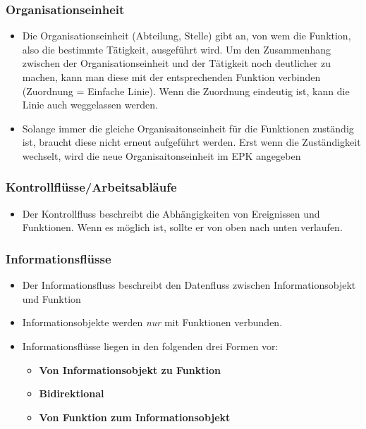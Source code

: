 \documentclass[a4paper, 12pt]{report}
\begin{document}
\begin{multicols}{2}
\subsubsection{Organisationseinheit}


\begin{itemize}
	\item Die Organisationseinheit (Abteilung, Stelle) gibt an, von wem die 
		Funktion, also die bestimmte Tätigkeit, ausgeführt wird. Um den 
		Zusammenhang zwischen der Organisationseinheit und der Tätigkeit 
		noch deutlicher zu machen, kann man diese mit der entsprechenden 
		Funktion verbinden (Zuordnung = Einfache Linie). Wenn die 
		Zuordnung eindeutig ist, kann die Linie auch weggelassen werden.
	\item Solange immer die gleiche Organisaitonseinheit für die Funktionen 
		zuständig ist, braucht diese nicht erneut aufgeführt werden. Erst wenn
		die Zuständigkeit wechselt, wird die neue Organisaitonseinheit im EPK 
		angegeben
\end{itemize}

\subsubsection{Kontrollflüsse/Arbeitsabläufe}

\begin{itemize}
	\item Der Kontrollfluss beschreibt die Abhängigkeiten von Ereignissen und 
		Funktionen. Wenn es möglich ist, sollte er von oben nach unten 
		verlaufen. 
\end{itemize}

\subsubsection{Informationsflüsse}

\begin{itemize}
	\item Der Informationsfluss beschreibt den Datenfluss zwischen 
		Informationsobjekt und Funktion
	\item Informationsobjekte werden \emph{nur} mit Funktionen verbunden. 
	\item Informationsflüsse liegen in den folgenden drei Formen vor:
	\begin{itemize}
		\item \textbf{Von Informationsobjekt zu Funktion}
		\item \textbf{Bidirektional}
		\item \textbf{Von Funktion zum Informationsobjekt}
	\end{itemize}
\end{itemize}


\end{multicols}
\end{document}
